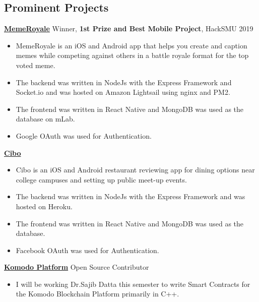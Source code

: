 \documentclass[margin]{res}
\begin{document}
\begin{resume}
\section{Prominent Projects} 
		{\bf \underline{MemeRoyale}} Winner, {\bf 1st Prize and Best Mobile Project}, HackSMU 2019  \hfill
                \begin{itemize} \itemsep -3pt
                 \item  MemeRoyale is an iOS and Android app that helps you create and caption memes 
                 while competing against others in a battle royale format for the top voted meme.
                 \item The backend was written in NodeJs with the Express Framework and Socket.io and was hosted on Amazon Lightsail using nginx and PM2.
                 \item The frontend was written in React Native and MongoDB was used as the database on mLab.
                 \item Google OAuth was used for Authentication. 
                 
                
		 \end{itemize}

         {\bf \underline{Cibo}} \hfill
         \begin{itemize} \itemsep -3pt
          \item  Cibo is an iOS and Android restaurant reviewing app for dining options near college campuses and setting up public meet-up events.
          \item The backend was written in NodeJs with the Express Framework and was hosted on Heroku.
          \item The frontend was written in React Native and MongoDB was used as the database.
          \item Facebook OAuth was used for Authentication. 
          
         
          \end{itemize}

          {\bf \underline{Komodo Platform}} Open Source Contributor
         \begin{itemize} \itemsep -3pt
          \item I will be working Dr.Sajib Datta this semester to write Smart Contracts for the Komodo Blockchain Platform primarily in C++.
          
         
          \end{itemize}
        



\end{resume}
\end{document}
